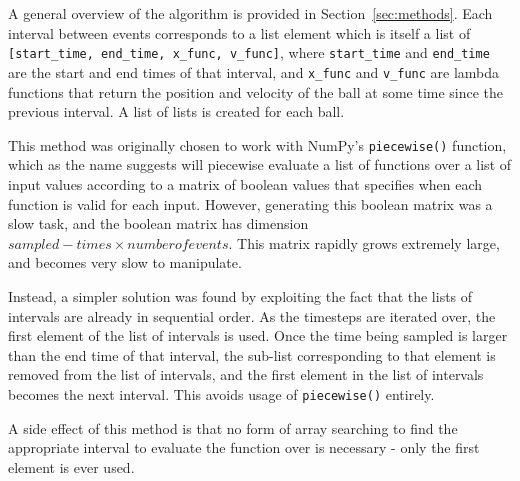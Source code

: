 \documentclass[pra,twocolumn,showpacs,amsmath,amssymb, aps, 10pt]{revtex4-1}
\begin{document}
A general overview of the algorithm is provided in Section~\ref{sec:methods}.
Each interval between events corresponds to a list element which is itself a list
of \texttt{[start\_time,~end\_time,~x\_func,~v\_func]}, where \texttt{start\_time}
and \texttt{end\_time} are the start and end times of that interval, and
\texttt{x\_func} and \texttt{v\_func} are lambda functions that return the
position and velocity of the ball at some time since the previous interval. A
list of lists is created for each ball.

This method was originally chosen to work with NumPy's \texttt{piecewise()}
function, which as the name suggests will piecewise evaluate a list of functions
over a list of input values according to a matrix of boolean values that specifies
when each function is valid for each input. However, generating this boolean matrix
was a slow task, and the boolean matrix has dimension
$sampled-times \times number of events$. %
This matrix rapidly grows extremely large, and becomes very slow to manipulate.

Instead, a simpler solution was found by exploiting the fact that the lists of
intervals are already in sequential order. As the timesteps are iterated over,
the first element of the list of intervals is used. Once the time being sampled
is larger than the end time of that interval, the sub-list corresponding to that
element is removed from the list of intervals, and the first element in the list
of intervals becomes the next interval. This avoids usage of \texttt{piecewise()}
entirely.

A side effect of this method is that no form of array searching to find the
appropriate interval to evaluate the function over is necessary - only the first
element is ever used.
\end{document}
